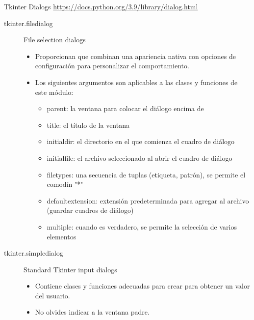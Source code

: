 \documentclass[10pt, envcountsect , spanish]{beamer}
\begin{document}
\begin{frame}{Tkinter Dialogs} {\url{https://docs.python.org/3.9/library/dialog.html}}



\begin{description}


\item[tkinter.filedialog] File selection dialogs

\begin{itemize}
\item
Proporcionan  que combinan una apariencia nativa con opciones de configuración para personalizar el comportamiento. 

\item
Los siguientes argumentos  son aplicables a las clases y funciones de este módulo:

\begin{itemize}
\item 
parent:  la ventana para colocar el diálogo encima de
\item 
title: el título de la ventana
\item 
initialdir: el directorio en el que comienza el cuadro de diálogo
\item 
initialfile: el archivo seleccionado al abrir el cuadro de diálogo
\item 
filetypes: una secuencia de tuplas (etiqueta, patrón), se permite el comodín "*"
\item 
defaultextension: extensión predeterminada para agregar al archivo (guardar cuadros de diálogo)
\item 
multiple: cuando es verdadero, se permite la selección de varios elementos
\end{itemize}

\end{itemize}


\item[tkinter.simpledialog] Standard Tkinter input dialogs

\begin{itemize}
\item
Contiene clases y funciones adecuadas para crear    para obtener un valor del usuario.

\item No olvides indicar a la ventana padre.
\end{itemize}


\end{description}
\end{frame}
\end{document}
